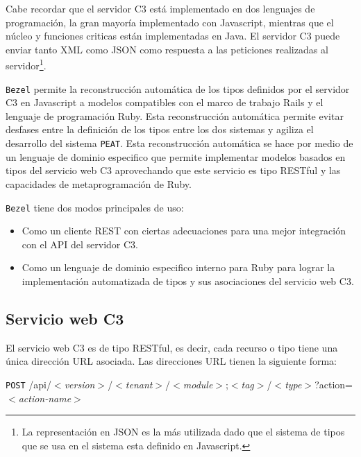 Cabe recordar que el servidor C3 está implementado en dos lenguajes de programación,
la gran mayoría implementado con Javascript, mientras que el núcleo y funciones
criticas están implementadas en Java. El servidor C3 puede enviar tanto XML como
JSON como respuesta a las peticiones realizadas al servidor\footnote{La representación en JSON
  es la más utilizada dado que el sistema de tipos que se usa en el sistema esta
  definido en Javascript.}.

\texttt{Bezel} permite la reconstrucción automática de los tipos definidos por el
servidor C3 en Javascript a modelos compatibles con el marco de trabajo Rails
y el lenguaje de programación Ruby. Esta reconstrucción automática permite
evitar desfases entre la definición de los tipos entre los dos sistemas y
agiliza el desarrollo del sistema \texttt{PEAT}. Esta reconstrucción automática
se hace por medio de un lenguaje de dominio especifico que permite implementar
modelos basados en tipos del servicio web C3 aprovechando que este servicio
es tipo RESTful y las capacidades de metaprogramación de Ruby.

\texttt{Bezel} tiene dos modos principales de uso:
\begin{itemize}
\item Como un cliente REST con ciertas adecuaciones para una mejor integración
  con el API del servidor C3.
\item Como un lenguaje de dominio especifico interno para Ruby para lograr
  la implementación automatizada de tipos y sus asociaciones del servicio web C3.
\end{itemize}

\subsection{Servicio web C3}

El servicio web C3 es de tipo RESTful, es decir, cada recurso o tipo tiene una única
dirección URL asociada. Las direcciones URL tienen la siguiente forma:

\vspace{2.5mm}
\texttt{POST} /api/$<$\textit{version}$>$/$<$\textit{tenant}$>$/$<$\textit{module}$>$;$<$\textit{tag}$>$/$<$\textit{type}$>$?action=$<$\textit{action-name}$>$

